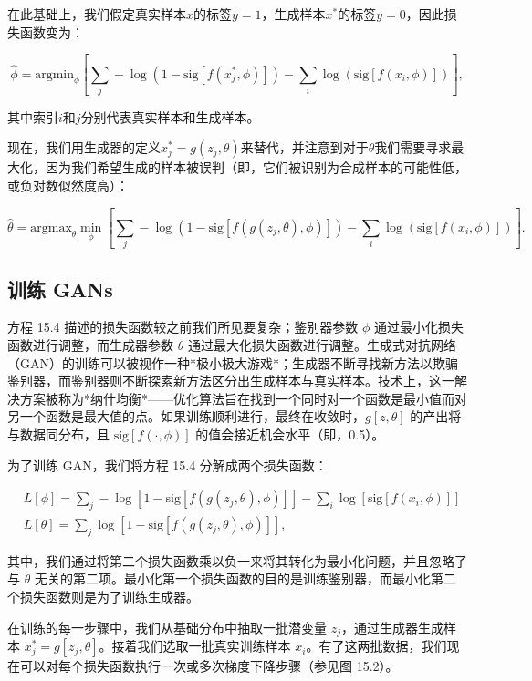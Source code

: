 在此基础上，我们假定真实样本\(x\)的标签\(y = 1\)，生成样本\(x^*\)的标签\(y = 0\)，因此损失函数变为：

\begin{equation}
\hat{\phi} = \text{argmin}_{\phi} \left[ \sum_j -\log \left( 1 - \text{sig}[f(x_j^*, \phi)] \right) - \sum_i \log \left( \text{sig}[f(x_i, \phi)] \right) \right], 
\end{equation}

其中索引\(i\)和\(j\)分别代表真实样本和生成样本。

现在，我们用生成器的定义\(x_j^* = g(z_j, \theta)\)来替代，并注意到对于\(\theta\)我们需要寻求最大化，因为我们希望生成的样本被误判（即，它们被识别为合成样本的可能性低，或负对数似然度高）：

\begin{equation}
\hat{\theta} = \text{argmax}_{\theta} \min_{\phi} \left[ \sum_j -\log \left(1 - \text{sig}[f(g(z_j, \theta), \phi)] \right) - \sum_i \log \left( \text{sig}[f(x_i, \phi)] \right) \right]. 
\end{equation}

\subsection{训练 GANs}
方程 15.4 描述的损失函数较之前我们所见要复杂；鉴别器参数 \(\phi\) 通过最小化损失函数进行调整，而生成器参数 \(\theta\) 通过最大化损失函数进行调整。生成式对抗网络（GAN）的训练可以被视作一种*极小极大游戏*；生成器不断寻找新方法以欺骗鉴别器，而鉴别器则不断探索新方法区分出生成样本与真实样本。技术上，这一解决方案被称为*纳什均衡*——优化算法旨在找到一个同时对一个函数是最小值而对另一个函数是最大值的点。如果训练顺利进行，最终在收敛时，\(g[z, \theta]\) 的产出将与数据同分布，且 \(\text{sig}[f(\cdot, \phi)]\) 的值会接近机会水平（即，0.5）。

为了训练 GAN，我们将方程 15.4 分解成两个损失函数：


\begin{align}
&L[\phi] = \sum_j -\log \left[ 1 - \text{sig}[f(g(z_j, \theta), \phi)] \right] - \sum_i \log \left[ \text{sig}[f(x_i, \phi)] \right] \\
&L[\theta] = \sum_j \log \left[ 1 - \text{sig}[f(g(z_j, \theta), \phi)] \right], 
\end{align} 


其中，我们通过将第二个损失函数乘以负一来将其转化为最小化问题，并且忽略了与 \(\theta\) 无关的第二项。最小化第一个损失函数的目的是训练鉴别器，而最小化第二个损失函数则是为了训练生成器。

在训练的每一步骤中，我们从基础分布中抽取一批潜变量 \(z_j\)，通过生成器生成样本 \(x_j^* = g[z_j, \theta]\)。接着我们选取一批真实训练样本 \(x_i\)。有了这两批数据，我们现在可以对每个损失函数执行一次或多次梯度下降步骤（参见图 15.2）。

